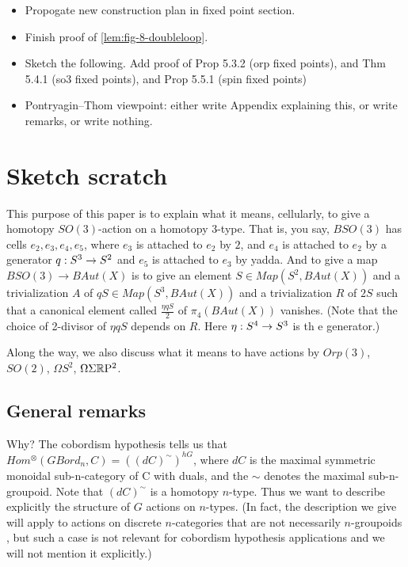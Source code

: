 \documentclass{amsart}
\begin{document}
\begin{itemize}
\item Propogate new construction plan in fixed point section.
\item Finish proof of \cref{lem:fig-8-doubleloop}.
\item Sketch the following. Add proof of Prop 5.3.2 (orp fixed points), and Thm 5.4.1 (so3 fixed points), and Prop 5.5.1 (spin fixed points)
\item Pontryagin--Thom viewpoint: either write Appendix explaining this, or write remarks, or write nothing.
\end{itemize}



\section*{Sketch scratch}

This purpose of this paper is to explain what it means, cellularly, to give a homotopy $SO(3)$-action on a homotopy 3-type.  That is, you say, $BSO(3)$ has cells $e_2, e_3, e_4, e_5$, where $e_3$ is attached to $e_2$ by $2$, and $e_4$ is attached to $e_2$ by a generator $q: S^3 \rightarrow S^2$ and $e_5$ is attached to $e_3$ by yadda.  And to give a map $BSO(3) \rightarrow BAut(X)$ is to give an element $S \in Map(S^2,BAut(X))$ and a trivialization $A$ of $q S \in Map(S^3,BAut(X))$ and a trivialization $R$ of $2S$ such that a canonical element called $\frac{\eta q S}{2}$ of $\pi_4(BAut(X))$ vanishes.  (Note that the choice of 2-divisor of $\eta q S$ depends on $R$.  Here $\eta: S^4 \rightarrow S^3$ is th 	e generator.)

Along the way, we also discuss what it means to have actions by $Orp(3)$, $SO(2)$, $\Omega S^2$, $\Omega \Sigma \mathbb R \mathrm{P}^2$.


\subsection{General remarks}

Why? The cobordism hypothesis tells us that $Hom^{\otimes}(GBord_n,C) = ((dC)^{\sim})^{hG}$, where $dC$ is the maximal symmetric monoidal sub-n-category of C with duals, and the $\sim$ denotes the maximal sub-n-groupoid.  Note that $(dC)^\sim$ is a homotopy $n$-type.  Thus we want to describe explicitly the structure of $G$ actions on $n$-types.  (In fact, the description we give will apply to actions on discrete $n$-categories that are not necessarily $n$-groupoids , but such a case is not relevant for cobordism hypothesis applications and we will not mention it explicitly.)
\end{document}
